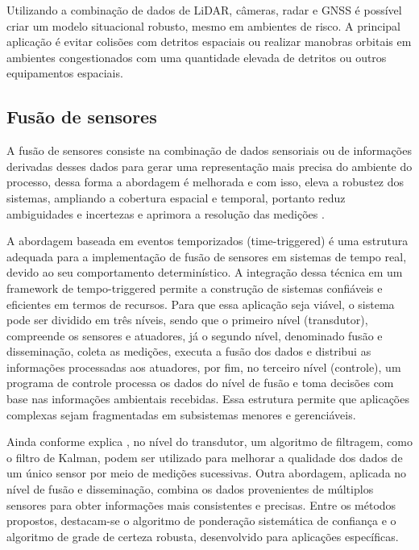 Utilizando a combinação de dados de LiDAR, câmeras, radar e GNSS é possível criar um modelo situacional robusto, mesmo em ambientes de risco. A principal aplicação é evitar colisões com detritos espaciais ou realizar manobras orbitais em ambientes congestionados com uma quantidade elevada de detritos ou outros equipamentos espaciais.

\subsection{Fusão de sensores}

A fusão de sensores consiste na combinação de dados sensoriais ou de informações derivadas desses dados para gerar uma representação mais precisa do ambiente do processo, dessa forma a abordagem é melhorada e com isso, eleva a robustez dos sistemas, ampliando a cobertura espacial e temporal, portanto reduz ambiguidades e incertezas e aprimora a resolução das medições \cite{elmenreichDissertation}.

A abordagem baseada em eventos temporizados (time-triggered) é uma estrutura adequada para a implementação de fusão de sensores em sistemas de tempo real, devido ao seu comportamento determinístico. A integração dessa técnica em um framework de tempo-triggered permite a construção de sistemas confiáveis e eficientes em termos de recursos. Para que essa aplicação seja viável, o sistema pode ser dividido em três níveis, sendo que o primeiro nível (transdutor), compreende os sensores e atuadores, já o segundo nível, denominado fusão e disseminação, coleta as medições, executa a fusão dos dados e distribui as informações processadas aos atuadores, por fim, no terceiro nível (controle), um programa de controle processa os dados do nível de fusão e toma decisões com base nas informações ambientais recebidas. Essa estrutura permite que aplicações complexas sejam fragmentadas em subsistemas menores e gerenciáveis.

Ainda conforme explica \cite{elmenreichDissertation}, no nível do transdutor, um algoritmo de filtragem, como o filtro de Kalman, podem ser utilizado para melhorar a qualidade dos dados de um único sensor por meio de medições sucessivas. Outra abordagem, aplicada no nível de fusão e disseminação, combina os dados provenientes de múltiplos sensores para obter informações mais consistentes e precisas. Entre os métodos propostos, destacam-se o algoritmo de ponderação sistemática de confiança e o algoritmo de grade de certeza robusta, desenvolvido para aplicações específicas.

